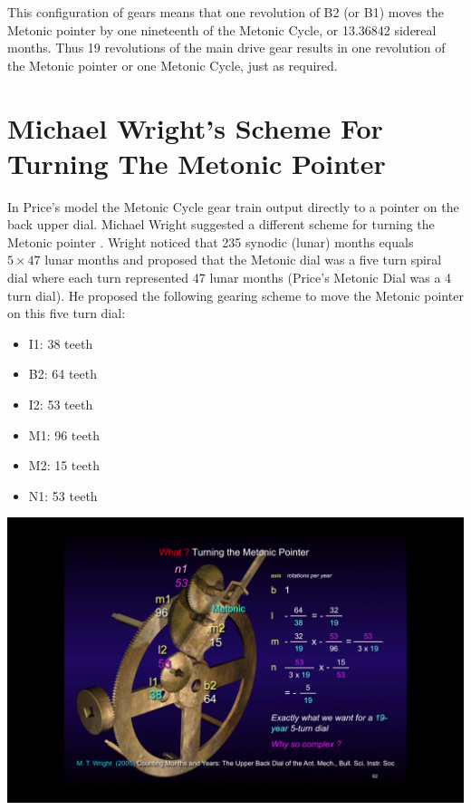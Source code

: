 \documentclass[11pt, oneside]{article}   	%
\theoremstyle{definition}
\begin{document}
\bigskip
\noindent
This configuration of gears means that one revolution of B2 (or B1) moves the Metonic pointer by one nineteenth of the Metonic Cycle, 
or 13.36842 sidereal months. Thus 19 revolutions of the main drive gear results in one revolution of the Metonic pointer or one Metonic Cycle, 
just as required.

\section{Michael Wright's Scheme For Turning The Metonic Pointer}
In Price's model the Metonic Cycle gear train output directly to a pointer on the back upper dial. Michael Wright suggested a different scheme for turning 
the Metonic pointer \cite{Wright2005a}. Wright noticed that 235 synodic (lunar) months equals $5 \times 47 \text{ lunar months}$ and proposed that the 
Metonic dial was a five turn spiral dial where each turn represented 47 lunar months (Price's Metonic Dial was a 4 turn dial). He proposed the following 
gearing scheme to move the Metonic pointer on this five turn dial:

\bigskip
\begin{minipage}[c]{0.45\textwidth}
  \begin{itemize}
      \item I1: 38 teeth
      \item B2: 64 teeth
      \item I2: 53 teeth
      \item M1: 96 teeth
      \item M2: 15 teeth
      \item N1: 53 teeth
  \end{itemize}
\end{minipage}
\hfill
\begin{minipage}[c]{0.60\textwidth}
  \includegraphics[width=\textwidth,cfbox=red]{images/turning_the_metonic_pointer_wright.png}
\end{minipage}
\end{document}
